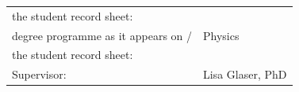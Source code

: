 \begin{titlepage}
\begin{center}
\begin{tabular}{p{9cm}p{11.25cm}}
        \fontsize{12}{0} \selectfont the student record sheet:\vspace*{0.4cm} &
        \fontsize{12}{0} \selectfont\\

        \fontsize{12}{0} \selectfont degree
        programme as it appears on / &  \fontsize{12}{0} \selectfont Physics \\

        \fontsize{12}{0} \selectfont the student record sheet:\vspace*{0.4cm} &
        \fontsize{12}{0} \selectfont \\

        \fontsize{12}{0} \selectfont
        Supervisor:\vspace*{0.4cm}& \fontsize{12}{0} \selectfont Lisa Glaser, PhD\\
\end{tabular}
\end{center}
\end{titlepage}
